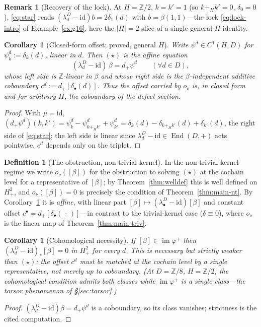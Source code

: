 \documentclass[11pt,reqno]{amsart}
\theoremstyle{plain}
\newtheorem{corollary}[theorem]{Corollary}
\theoremstyle{definition}
\newtheorem{definition}[theorem]{Definition}
\newtheorem{remark}[theorem]{Remark}
\newcommand{\Z}{\mathbb{Z}}
\newcommand{\id}{\mathrm{id}}
\newcommand{\im}{\operatorname{im}}
\newcommand{\End}{\operatorname{End}}
\newcommand{\lD}{\lambda^{D}}
\begin{document}
\begin{remark}[Recovery of the lock]\label{rem:lock}
At $H=\Z/2$, $k=k'=1$ (so $k+_Hk'=0$, $\delta_0=0$), \eqref{eq:star} reads
$(\lD_d-\id)b=2\delta_1(d)$ with $b=\beta(1,1)$---the lock \eqref{eq:lock-intro} of
Example~\ref{ex:g16}, here the $|H|=2$ slice of a single general-$H$ identity.
\end{remark}

\begin{corollary}[Closed-form offset; proved, general $H$]\label{cor:offset}
Write $\psi^d\in C^1(H,D)$ for $\psi^d_k:=\delta_k(d)$, linear in $d$. Then $(\star)$ is the
affine equation
\begin{equation}\label{eq:offset}
(\lD_d-\id)\,\beta=d_+\psi^d\qquad(\forall d\in D),
\end{equation}
whose left side is $\Z$-linear in $\beta$ and whose right side is the $\beta$-independent
additive coboundary $c^d:=d_+[\delta_\bullet(d)]$. Thus the offset carried by $o_\nu$ is, in
closed form and for arbitrary $H$, the coboundary of the defect section.
\end{corollary}
\begin{proof}
With $\mu=\id$, $(d_+\psi^d)(k,k')=\psi^d_k-\psi^d_{k+_Hk'}+\psi^d_{k'}
=\delta_k(d)-\delta_{k+_Hk'}(d)+\delta_{k'}(d)$, the right side of \eqref{eq:star}; the left
side is linear since $\lD_d-\id\in\End(D,+)$ acts pointwise. $c^d$ depends only on the
triplet.
\end{proof}

\begin{definition}[The obstruction, non-trivial kernel]\label{def:onu-nt}
In the non-trivial-kernel regime we write $o_\nu([\beta])$ for the obstruction to solving
$(\star)$ at the cochain level for a representative of $[\beta]$; by Theorem~\ref{thm:welldef}
this is well defined on $H^2_+$, and $o_\nu([\beta])=0$ is precisely the condition of
Theorem~\ref{thm:main-nt}. By Corollary~\ref{cor:offset} it is \emph{affine}, with linear
part $[\beta]\mapsto(\lD_\bullet-\id)[\beta]$ and constant offset
$c^\bullet=d_+[\delta_\bullet(\,\cdot\,)]$---in contrast to the trivial-kernel case
($\delta\equiv0$), where $o_\nu$ is the linear map of Theorem~\ref{thm:main-triv}.
\end{definition}

\begin{corollary}[Cohomological necessity]\label{cor:coho}
If $[\beta]\in\im\varphi^{+}$ then $(\lD_d-\id)_*[\beta]=0$ in $H^2_+$ for every $d$. This
is necessary but strictly weaker than $(\star)$: the offset $c^d$ must be matched at the
\emph{cochain} level by a single representative, not merely up to coboundary. (At $D=\Z/8$,
$H=\Z/2$, the cohomological condition admits both classes while $\im\varphi^{+}$ is a single
class---the torsor phenomenon of \S\ref{sec:torsor}.)
\end{corollary}
\begin{proof}
$(\lD_d-\id)\beta=d_+\psi^d$ is a coboundary, so its class vanishes; strictness is the cited
computation.
\end{proof}
\end{document}
